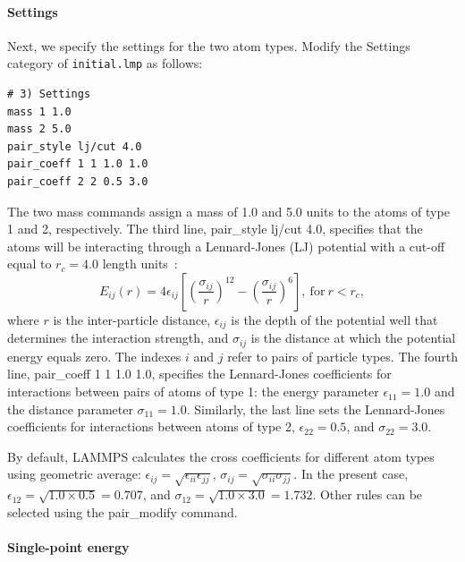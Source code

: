 \documentclass[9pt,tutorial]{livecoms}
\newcommand{\lmpcmd}[1]{\hspace{0pt}\colorbox{listing}{\textcolor{command}{\small{#1}}}\hspace{0pt}} %
\newcommand{\flecmd}[1]{\textcolor{command}{\texttt{#1}}} %
\begin{document}
\paragraph{Settings}

Next, we specify the settings for the two atom types.  Modify the
\lmpcmd{Settings} category of \flecmd{initial.lmp} as follows:
\begin{lstlisting}
# 3) Settings
mass 1 1.0
mass 2 5.0
pair_style lj/cut 4.0
pair_coeff 1 1 1.0 1.0
pair_coeff 2 2 0.5 3.0
\end{lstlisting}
The two \lmpcmd{mass} commands assign a mass of 1.0 and 5.0 units to the
atoms of type 1 and 2, respectively.  The third line,
\lmpcmd{pair\_style lj/cut 4.0}, specifies that the atoms will be
interacting through a Lennard-Jones (LJ) potential with a cut-off equal
to $r_c = 4.0$ length units~\cite{wang2020lennard,fischer2023history}:
\begin{equation}
E_{ij} (r) = 4 \epsilon_{ij} \left[ \left( \dfrac{\sigma_{ij}}{r} \right)^{12}
  - \left( \dfrac{\sigma_{ij}}{r} \right)^{6} \right], ~ \text{for} ~ r < r_c,
\label{eq:LJ}
\end{equation}
where $r$ is the inter-particle distance, $\epsilon_{ij}$ is
the depth of the potential well that determines the interaction strength, and
$\sigma_{ij}$ is the distance at which the potential energy equals zero.
The indexes $i$ and $j$ refer to pairs of particle types.
The fourth line, \lmpcmd{pair\_coeff 1 1 1.0 1.0}, specifies the
Lennard-Jones coefficients for interactions between pairs of atoms
of type 1: the energy parameter $\epsilon_{11} = 1.0$ and
the distance parameter $\sigma_{11} = 1.0$.  Similarly, the last line
sets the Lennard-Jones coefficients for interactions between atoms
of type 2, $\epsilon_{22} = 0.5$, and $\sigma_{22} = 3.0$.

\begin{note}
By default, LAMMPS calculates the cross coefficients for different atom
types using geometric average: $\epsilon_{ij} = \sqrt{\epsilon_{ii} \epsilon_{jj}}$,
$\sigma_{ij} = \sqrt{\sigma_{ii} \sigma_{jj}}$.  In the present case,
$\epsilon_{12} = \sqrt{1.0 \times 0.5} = 0.707$, and
$\sigma_{12} = \sqrt{1.0 \times 3.0} = 1.732$. {\color{blue}Other rules
can be selected using the \lmpcmd{pair\_modify} command.}
\end{note}

\paragraph{Single-point energy}
\end{document}

